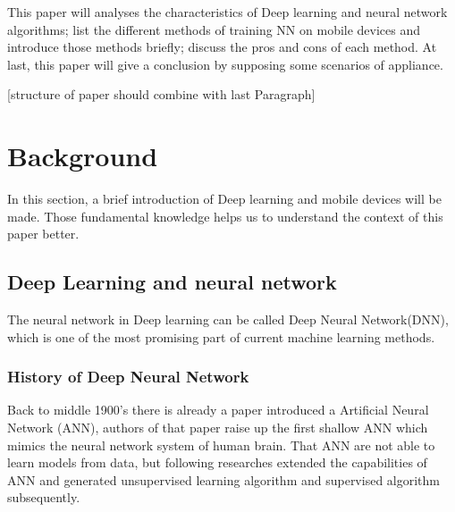 \documentclass[article]{aaltoseries}
\begin{document}
This paper will analyses the characteristics of Deep learning and neural network algorithms;
list the different methods of training NN on mobile devices and introduce those methods briefly; 
discuss the pros and cons of each method.
At last, this paper will give a conclusion by supposing some scenarios of appliance.


[structure of paper should combine with last Paragraph]









\section{Background}

In this section, a brief introduction of Deep learning and mobile devices will be made. Those fundamental 
knowledge helps us to understand the context of this paper better.




\subsection{Deep Learning and neural network}

The neural network in Deep learning can be called Deep Neural Network(DNN), which is one of the most promising 
part of current machine learning methods. 

\subsubsection{History of Deep Neural Network}

Back to middle 1900's there is already a paper introduced a Artificial Neural Network (ANN)\cite{Warren1943}, authors
of that paper raise up the first shallow ANN which mimics the neural network system of human brain. That ANN are not
able to learn models from data, but following researches extended the capabilities of ANN and generated unsupervised 
learning algorithm and supervised algorithm subsequently.
\end{document}
